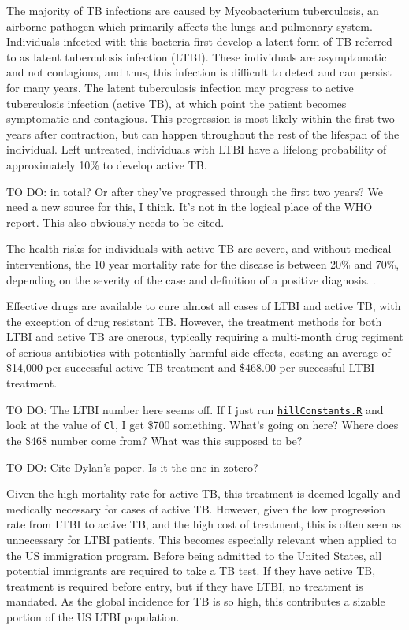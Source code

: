 \documentclass{amsart}
\renewcommand{\(}{\left(}
\renewcommand{\)}{\right)}
\newcommand{\TODO}[1]{\begin{framed}{\huge \color{red} TO DO:}
  #1 \end{framed}}
\begin{document}
The majority of TB infections are caused by Mycobacterium tuberculosis, 
an airborne pathogen which primarily affects the lungs and pulmonary system.  
Individuals infected with this bacteria first develop a latent form of TB
referred to as latent tuberculosis infection (LTBI).  These individuals are
asymptomatic and not contagious, and thus, this infection is difficult to detect
and can persist for many years. The latent tuberculosis infection may progress
to active tuberculosis infection (active TB), at which point the patient becomes
symptomatic and contagious. This progression is most likely within the first two
years after contraction, but can happen throughout the rest of the lifespan of
the individual.  Left untreated, individuals with LTBI have a lifelong
probability of approximately 10\% to develop active TB.
\TODO{in total? Or after they've progressed through the first two years? We need
a new source for this, I think. It's not in the logical place of the WHO report.
This also obviously needs to be cited. }
The health risks for individuals with active TB are severe, and without medical
interventions, the 10 year mortality rate for the disease is between 20\% and
70\%, depending on the severity of the case and definition of a positive
diagnosis.
\cite{_who_2013}.

Effective drugs are available to cure almost all cases of LTBI and active TB,
with the exception of drug resistant TB. However, the treatment methods for both
LTBI and active TB are onerous, typically requiring a multi-month drug regiment
of serious antibiotics with potentially harmful side effects, costing an average
of \$14,000 per successful active TB treatment and \$468.00 per successful LTBI
treatment. 
\TODO{The LTBI number here seems off. If I just run
  \href{https://github.com/mmcdermott/disease-modeling/blob/master/in_progress/models/costBenefitAnalysis/hillConstants.R}{\texttt{hillConstants.R}}
  and look at the value of \texttt{Cl}, I get \$700 something. What's going on
  here? Where does the \$468 number come from? What was this supposed to be?}
\TODO{Cite Dylan's paper. Is it the one in zotero?}
Given the high mortality rate for active TB, this treatment is deemed legally
and medically necessary for cases of active TB. However, given the low
progression rate from LTBI to active TB, and the high cost of treatment, this is
often seen as unnecessary for LTBI patients. This becomes especially relevant
when applied to the US immigration program. Before being admitted to the United
States, all potential immigrants are required to take a TB test. If they have
active TB, treatment is required before entry, but if they have LTBI, no
treatment is mandated. As the global incidence for TB is so high, this
contributes a sizable portion of the US LTBI population.
\end{document}
